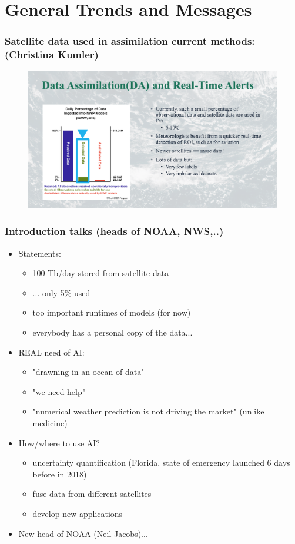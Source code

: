 \documentclass{beamer}
\begin{document}
\section{General Trends and Messages}

\begin{frame}
\frametitle{Satellite data used in assimilation current methods: (Christina Kumler)}
\begin{figure}
	\includegraphics[width=\linewidth]{figs/Data_Assimilation.png}
\end{figure}
\end{frame}


\begin{frame}
\frametitle{Introduction talks (heads of NOAA, NWS,..)}

\begin{itemize}

\item Statements: 
	\begin{itemize}
		\item 100 Tb/day stored from satellite data
		\item ... only 5\% used
		\item too important runtimes of models (for now)
		\item everybody has a personal copy of the data...
	\end{itemize}
\item REAL need of AI:
	\begin{itemize}
		\item "drawning in an ocean of data"
		\item "we need help"
		\item "numerical weather prediction is not driving the market" (unlike medicine)
	\end{itemize}
\item How/where to use AI?
	\begin{itemize}
		\item uncertainty quantification (Florida, state of emergency launched 6 days before in 2018)
		\item fuse data from different satellites
		\item develop new applications
	\end{itemize}
\item New head of NOAA (Neil Jacobs)...
\end{itemize}
\end{frame}
\end{document}
